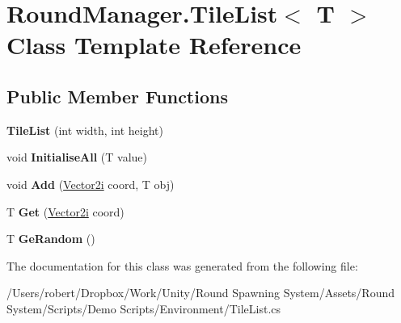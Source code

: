\hypertarget{class_round_manager_1_1_tile_list}{}\section{Round\+Manager.\+Tile\+List$<$ T $>$ Class Template Reference}
\label{class_round_manager_1_1_tile_list}
\subsection*{Public Member Functions}
\begin{DoxyCompactItemize}
\item 
\hypertarget{class_round_manager_1_1_tile_list_acce1fe0626e9dec9fa1aae5b999ffcfe}{}{\bfseries Tile\+List} (int width, int height)\label{class_round_manager_1_1_tile_list_acce1fe0626e9dec9fa1aae5b999ffcfe}

\item 
\hypertarget{class_round_manager_1_1_tile_list_a5a563ce0e59eb528ab5de2e55fe8ea73}{}void {\bfseries Initialise\+All} (T value)\label{class_round_manager_1_1_tile_list_a5a563ce0e59eb528ab5de2e55fe8ea73}

\item 
\hypertarget{class_round_manager_1_1_tile_list_a5c557de3ca7990333c3cea3fe2c0f8a5}{}void {\bfseries Add} (\hyperlink{struct_round_manager_1_1_vector2i}{Vector2i} coord, T obj)\label{class_round_manager_1_1_tile_list_a5c557de3ca7990333c3cea3fe2c0f8a5}

\item 
\hypertarget{class_round_manager_1_1_tile_list_a82377d7f3deb55f093154320041132ea}{}T {\bfseries Get} (\hyperlink{struct_round_manager_1_1_vector2i}{Vector2i} coord)\label{class_round_manager_1_1_tile_list_a82377d7f3deb55f093154320041132ea}

\item 
\hypertarget{class_round_manager_1_1_tile_list_a87e7860bce417d1748d8f0eb8d16baa3}{}T {\bfseries Ge\+Random} ()\label{class_round_manager_1_1_tile_list_a87e7860bce417d1748d8f0eb8d16baa3}

\end{DoxyCompactItemize}


The documentation for this class was generated from the following file\+:\begin{DoxyCompactItemize}
\item 
/\+Users/robert/\+Dropbox/\+Work/\+Unity/\+Round Spawning System/\+Assets/\+Round System/\+Scripts/\+Demo Scripts/\+Environment/Tile\+List.\+cs\end{DoxyCompactItemize}
